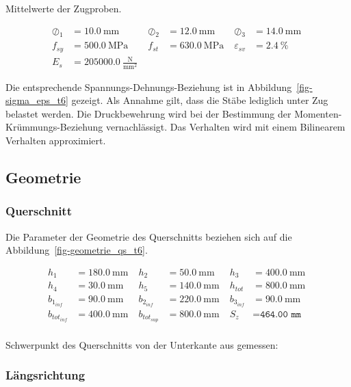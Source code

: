 \documentclass[
  11pt,
  letterpaper,
]{scrreprt}
\begin{document}
Mittelwerte der Zugproben.

$$
\begin{aligned}
\oslash_{1} &= 10.0\ \mathrm{mm} \; 
 &\oslash_{2} &= 12.0\ \mathrm{mm} \; 
 &\oslash_{3} &= 14.0\ \mathrm{mm} \; 
\\[10pt]
 f_{sy} &= 500.0\ \mathrm{MPa} \; 
 &f_{st} &= 630.0\ \mathrm{MPa} \; 
 &\varepsilon_{sv} &= 2.4\ \mathrm{\%} \; 
\\[10pt]
 E_{s} &= 205000.0\ \frac{\mathrm{N}}{\mathrm{mm}^{2}} \;
\end{aligned}
$$

Die entsprechende Spannungs-Dehnungs-Beziehung ist in
Abbildung~\ref{fig-sigma_eps_t6} gezeigt. Als Annahme gilt, dass die
Stäbe lediglich unter Zug belastet werden. Die Druckbewehrung wird bei
der Bestimmung der Momenten-Krümmungs-Beziehung vernachlässigt. Das
Verhalten wird mit einem Bilinearem Verhalten approximiert.

\subsection{Geometrie}\label{geometrie}

\subsubsection{Querschnitt}\label{querschnitt}

Die Parameter der Geometrie des Querschnitts beziehen sich auf die
Abbildung~\ref{fig-geometrie_qs_t6}.

$$
\begin{aligned}
h_{1} &= 180.0\ \mathrm{mm} \; 
 &h_{2} &= 50.0\ \mathrm{mm} \; 
 &h_{3} &= 400.0\ \mathrm{mm} \; 
\\[10pt]
 h_{4} &= 30.0\ \mathrm{mm} \; 
 &h_{5} &= 140.0\ \mathrm{mm} \; 
 &h_{tot} &= 800.0\ \mathrm{mm} \; 
\\[10pt]
 b_{1_{inf}} &= 90.0\ \mathrm{mm} \; 
 &b_{2_{inf}} &= 220.0\ \mathrm{mm} \; 
 &b_{3_{inf}} &= 90.0\ \mathrm{mm} \; 
\\[10pt]
 b_{tot_{inf}} &= 400.0\ \mathrm{mm} \; 
 &b_{tot_{sup}} &= 800.0\ \mathrm{mm} \; 
 &S_{z} &= \mathtt{\text{464.00 mm}} \; 
\\[10pt]
\end{aligned}
$$

Schwerpunkt des Querschnitts von der Unterkante aus gemessen:

\subsubsection{Längsrichtung}\label{luxe4ngsrichtung}
\end{document}

